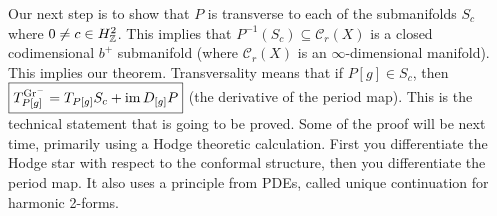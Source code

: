 Our next step is to show that $P$ is transverse to each of the submanifolds $S_c$ where $0\neq c \in H^2_{\mathbb{Z}}$. This implies that $P^{-1}(S_c) \subseteq \mathcal C_r(X)$ is a closed codimensional $b^+$ submanifold (where $\mathcal C_r(X)$ is an $\infty$-dimensional manifold). This implies our theorem. Transversality means that if $P[g] \in S_c$, then $\boxed{T _{P[g]}^{\mathrm{Gr}^-}= T_{P[g]}S_c + \operatorname{im} D_{[g]}P}$ (the derivative of the period map). This is the technical statement that is going to be proved. Some of the proof will be next time, primarily using a Hodge theoretic calculation. First you differentiate the Hodge star with respect to the conformal structure, then you differentiate the period map. It also uses a principle from PDEs, called unique continuation for harmonic 2-forms.

